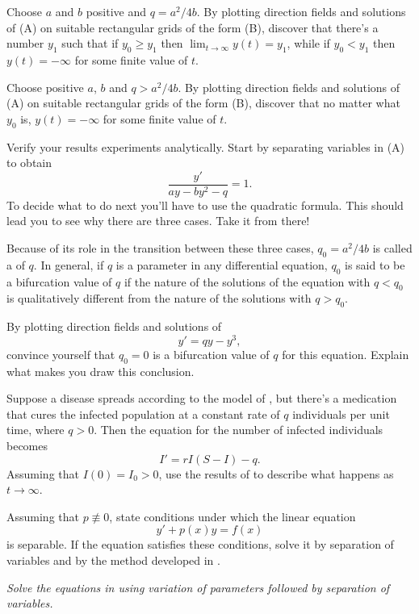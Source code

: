 \begin{exerciselist}
\begin{alist}
\item %
Choose $a$ and $b$ positive and $q=a^2/4b$. By plotting direction
fields
and solutions of (A) on suitable rectangular grids of the form (B),
discover that there's a number $y_1$ such that if $y_0\ge y_1$ then
$\lim_{t\to\infty}y(t)=y_1$, while if $y_0<y_1$ then  $y(t)=-\infty$
for some finite value of $t$.

\item %
Choose positive $a$, $b$ and $q>a^2/4b$. By plotting direction fields
and solutions of (A) on suitable rectangular grids of the form (B),
discover that
no matter what $y_0$ is, $y(t)=-\infty$ for some finite value of $t$.

\item %
Verify your results experiments analytically.
Start by separating variables in (A)  to obtain
\[
\frac{y'}{ay-by^2-q}=1.
\]
To decide what to do next you'll have to use the
quadratic formula. This should lead you to see why there are
three cases.  Take it from there!

Because of its role in the transition between these
three cases,  $q_0=a^2/4b$ is called a 
of $q$. In general, if $q$ is a parameter in any differential
equation,  $q_0$ is said to be a bifurcation value of
$q$ if the nature of the solutions of the equation with $q<q_0$
is qualitatively different from the nature of the solutions
with $q>q_0$.
\end{alist}

\item\label{exer:2.2.32}\Lex
By plotting direction fields and solutions of
\[
y'=qy-y^3,
\]
convince yourself that $q_0=0$ is a bifurcation value of $q$
for this equation. Explain what makes you draw this conclusion.

\item\label{exer:2.2.33}Suppose a disease spreads according to the model of
, but
there's a medication that cures the infected population at a constant
rate of $q$ individuals per unit  time, where $q>0$.
Then
the equation for the number of infected individuals becomes
\[
I'=rI(S-I)-q.
\]
Assuming that $I(0)=I_0>0$, use the results of
 to describe what happens as $t\to\infty$.

\item\label{exer:2.2.34}Assuming that $p \not\equiv 0$, state conditions under which the linear
equation
\[
y'+p(x)y=f(x)
\]
is separable.  If the equation satisfies these conditions, solve it by
separation of variables and by the method developed in
.
\end{exerciselist}
%
\textsl{Solve the equations in
 using variation of
parameters followed by separation of variables.}


